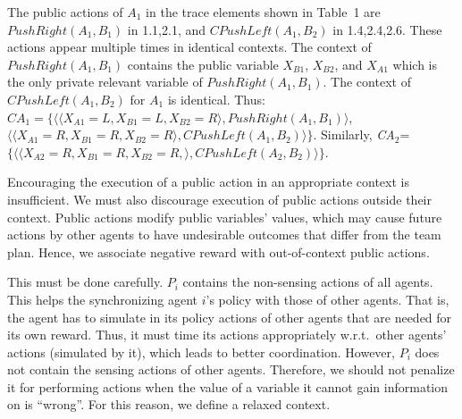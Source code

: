 \documentclass[runningheads]{llncs}
\newcommand{\cact}[1]{{\em CA$_#1$}}
\newcommand{\PushRight}{\mathit{PushRight}}
\newcommand{\CPushLeft}{\mathit{CPushLeft}}
\begin{document}
\begin{example}
The public actions of $A_1$  in the trace elements shown
in Table~1 are $\PushRight(A_1,B_1)$ in 1.1,2.1, and  $\CPushLeft(A_1,B_2)$ in 1.4,2.4,2.6. These
actions appear multiple times in identical contexts.
The context of $\PushRight(A_1,B_1)$ contains the public variable $X_{B1}$, $X_{B2}$, and $X_{A1}$ which is the only private relevant variable of $\PushRight(A_1,B_1)$. 
The context of $\CPushLeft(A_1,B_2)$ for $A_1$ is identical.
Thus:
$CA_1=\{ \langle\langle X_{A1}=L, X_{B1}=L, X_{B2}=R\rangle,\PushRight(A_1,B_1)
\rangle$,
$\langle\langle X_{A1}=R, X_{B1}=R, X_{B2}=R \rangle,\CPushLeft(A_1,B_2)\rangle\}$.
%
Similarly, \cact{2}=$\{\langle \langle X_{A2}=R, X_{B1}=R, X_{B2}=R, \rangle ,\CPushLeft(A_2,B_2)\rangle\}$.
\end{example}

Encouraging the execution of a public action in an appropriate context is insufficient. We must also discourage execution of public actions outside their context. Public actions modify public variables' values, which may cause future actions by other agents to have undesirable outcomes that differ
from the team plan. Hence, we associate negative reward with out-of-context public actions. 

This must be done carefully. $P_i$ contains the non-sensing actions of all agents. This helps the synchronizing agent $i$'s policy with those
of other agents. That is, the agent has to simulate in its policy actions of other agents that are needed for its own reward. %
Thus, it must time its actions appropriately w.r.t.~other agents' actions (simulated by it), which leads to better coordination. 
However, $P_i$ does not contain the sensing actions of other agents. Therefore, we should not penalize it for performing actions when the value of a variable it cannot gain information on is ``wrong''. For this reason, we define a relaxed context. 
\end{document}
